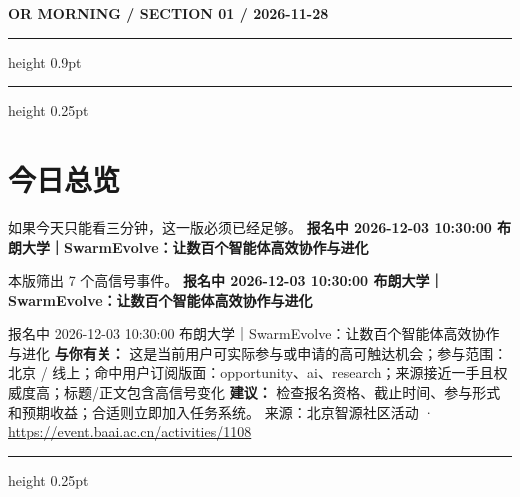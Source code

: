 \documentclass[10.5pt]{ctexart}
\begin{document}
{\small\bfseries OR MORNING / SECTION 01 / 2026-11-28}
\vspace{2mm}
\hrule height 0.9pt
\vspace{1.5mm}
\hrule height 0.25pt
\vspace{4mm}
\section*{今日总览}
{\color{ormuted} 如果今天只能看三分钟，这一版必须已经足够。}
\vspace{2mm}
{\fontsize{25}{29}\selectfont\bfseries 报名中 2026-12-03 10:30:00 布朗大学｜SwarmEvolve：让数百个智能体高效协作与进化}\par
\vspace{2mm}
{\large 本版筛出 7 个高信号事件。}
\vspace{3mm}
{\Large\bfseries 报名中 2026-12-03 10:30:00 布朗大学｜SwarmEvolve：让数百个智能体高效协作与进化}\par
报名中 2026-12-03 10:30:00 布朗大学｜SwarmEvolve：让数百个智能体高效协作与进化
\textbf{与你有关：} 这是当前用户可实际参与或申请的高可触达机会；参与范围：北京 / 线上；命中用户订阅版面：opportunity、ai、research；来源接近一手且权威度高；标题/正文包含高信号变化
\textbf{建议：} 检查报名资格、截止时间、参与形式和预期收益；合适则立即加入任务系统。
{\footnotesize\color{ormuted} 来源：北京智源社区活动 · \url{https://event.baai.ac.cn/activities/1108}}
\vspace{3mm}
\hrule height 0.25pt
\vspace{3mm}
\end{document}
